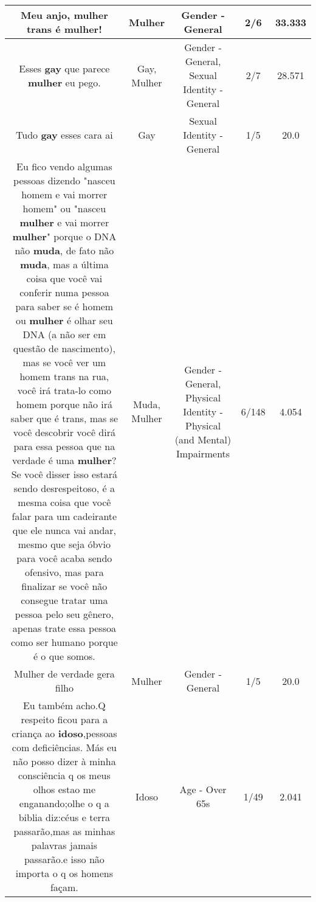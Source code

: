 \documentclass[11pt]{article}
\newlength\mylength
\begin{document}
\begin{center}
\begin{longtable}{|C{.65\mylength}|C{.30\mylength}|C{.12\mylength}|C{.12\mylength}|C{.12\mylength}|}
  \small Meu anjo, \textbf{mulher} trans é \textbf{mulher}!\normalsize   & Mulher & Gender - General & 2/6 & 33.333 \\  \hline
  \small Esses \textbf{gay} que parece \textbf{mulher} eu pego.\normalsize   & Gay, Mulher & Gender - General, Sexual Identity - General & 2/7 & 28.571 \\  \hline
  \small Tudo \textbf{gay} esses cara ai\normalsize   & Gay & Sexual Identity - General & 1/5 & 20.0 \\  \hline
  \small Eu fico vendo algumas pessoas dizendo "nasceu homem e vai morrer homem" ou "nasceu \textbf{mulher} e vai morrer \textbf{mulher}" porque o DNA não \textbf{muda}, de fato não \textbf{muda}, mas a última coisa que você vai conferir numa pessoa para saber se é homem ou \textbf{mulher} é olhar seu DNA (a não ser em questão de nascimento), mas se você ver um homem trans na rua, você irá trata-lo como homem porque não irá saber que é trans, mas se você descobrir você dirá para essa pessoa que na verdade é uma \textbf{mulher}? Se você disser isso estará sendo desrespeitoso, é a mesma coisa que você falar para um cadeirante que ele nunca vai andar, mesmo que seja óbvio para você acaba sendo ofensivo, mas para finalizar se você não consegue tratar uma pessoa pelo seu gênero, apenas trate essa pessoa como ser humano porque é o que somos.\normalsize   & Muda, Mulher & Gender - General, Physical Identity - Physical (and Mental) Impairments & 6/148 & 4.054 \\  \hline
  \small Mulher de verdade gera filho\normalsize   & Mulher & Gender - General & 1/5 & 20.0 \\  \hline
  \small Eu também acho.Q respeito ficou para a criança ao \textbf{idoso},pessoas com deficiências. Más eu não posso dizer à minha consciência q os meus olhos estao me enganando;olhe o q a biblia diz:céus e terra passarão,mas as minhas palavras jamais passarão.e isso não importa o q os homens façam.\normalsize   & Idoso & Age - Over 65s & 1/49 & 2.041 \\  \hline

\end{longtable}
\end{center}
\end{document}
